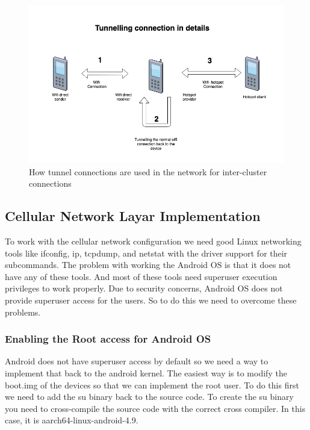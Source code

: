 \begin{figure}[H]
    \centering
    \includegraphics[scale=0.42]{images/tunnel_connection}
    \caption{How tunnel connections are used in the network for inter-cluster connections}
    \label{fig:timeffline_de_FR_W_AF_FW_FG_SDr}
\end{figure}
\vspace{12pt}
  


\subsection{Cellular Network Layar Implementation}

To work with the cellular network configuration we need good Linux networking tools like ifconfig, ip, tcpdump, and netstat with the driver support for their subcommands. The problem with working the Android OS is that it does not have any of these tools. And most of these tools need superuser execution privileges to work properly. Due to security concerns, Android OS does not provide superuser access for the users. So to do this we need to overcome these problems.
\subsubsection{Enabling the Root access for Android OS}
Android does not have superuser access by default so we need a way to implement that back to the android kernel. The easiest way is to modify the boot.img of the devices so that we can implement the root user. To do this first we need to add the su binary back to the source code. To create the su binary you need to cross-compile the source code with the correct cross compiler. In this case, it is aarch64-linux-android-4.9. 

